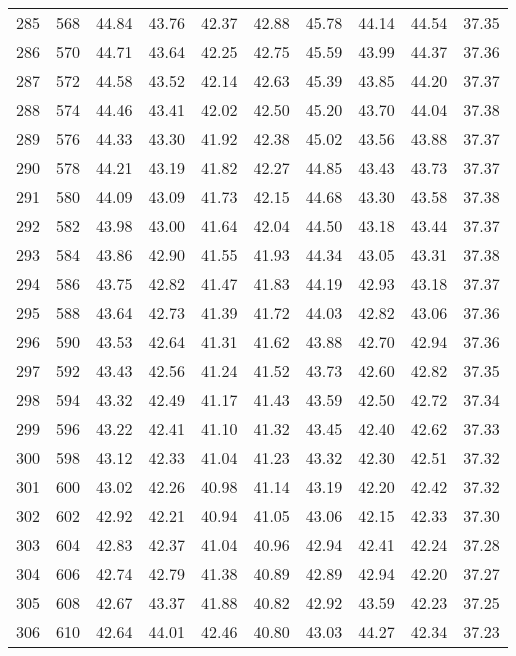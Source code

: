 \begin{longtable}{rrllllllll}
		285 & 568 & 44.84 & 43.76 & 42.37 & 42.88 & 45.78 & 44.14 & 44.54 & 37.35 \\ 
		286 & 570 & 44.71 & 43.64 & 42.25 & 42.75 & 45.59 & 43.99 & 44.37 & 37.36 \\ 
		287 & 572 & 44.58 & 43.52 & 42.14 & 42.63 & 45.39 & 43.85 & 44.20 & 37.37 \\ 
		288 & 574 & 44.46 & 43.41 & 42.02 & 42.50 & 45.20 & 43.70 & 44.04 & 37.38 \\ 
		289 & 576 & 44.33 & 43.30 & 41.92 & 42.38 & 45.02 & 43.56 & 43.88 & 37.37 \\ 
		290 & 578 & 44.21 & 43.19 & 41.82 & 42.27 & 44.85 & 43.43 & 43.73 & 37.37 \\ 
		291 & 580 & 44.09 & 43.09 & 41.73 & 42.15 & 44.68 & 43.30 & 43.58 & 37.38 \\ 
		292 & 582 & 43.98 & 43.00 & 41.64 & 42.04 & 44.50 & 43.18 & 43.44 & 37.37 \\ 
		293 & 584 & 43.86 & 42.90 & 41.55 & 41.93 & 44.34 & 43.05 & 43.31 & 37.38 \\ 
		294 & 586 & 43.75 & 42.82 & 41.47 & 41.83 & 44.19 & 42.93 & 43.18 & 37.37 \\ 
		295 & 588 & 43.64 & 42.73 & 41.39 & 41.72 & 44.03 & 42.82 & 43.06 & 37.36 \\ 
		296 & 590 & 43.53 & 42.64 & 41.31 & 41.62 & 43.88 & 42.70 & 42.94 & 37.36 \\ 
		297 & 592 & 43.43 & 42.56 & 41.24 & 41.52 & 43.73 & 42.60 & 42.82 & 37.35 \\ 
		298 & 594 & 43.32 & 42.49 & 41.17 & 41.43 & 43.59 & 42.50 & 42.72 & 37.34 \\ 
		299 & 596 & 43.22 & 42.41 & 41.10 & 41.32 & 43.45 & 42.40 & 42.62 & 37.33 \\ 
		300 & 598 & 43.12 & 42.33 & 41.04 & 41.23 & 43.32 & 42.30 & 42.51 & 37.32 \\ 
		301 & 600 & 43.02 & 42.26 & 40.98 & 41.14 & 43.19 & 42.20 & 42.42 & 37.32 \\ 
		302 & 602 & 42.92 & 42.21 & 40.94 & 41.05 & 43.06 & 42.15 & 42.33 & 37.30 \\ 
		303 & 604 & 42.83 & 42.37 & 41.04 & 40.96 & 42.94 & 42.41 & 42.24 & 37.28 \\ 
		304 & 606 & 42.74 & 42.79 & 41.38 & 40.89 & 42.89 & 42.94 & 42.20 & 37.27 \\ 
		305 & 608 & 42.67 & 43.37 & 41.88 & 40.82 & 42.92 & 43.59 & 42.23 & 37.25 \\ 
		306 & 610 & 42.64 & 44.01 & 42.46 & 40.80 & 43.03 & 44.27 & 42.34 & 37.23 \\ 

\end{longtable}
